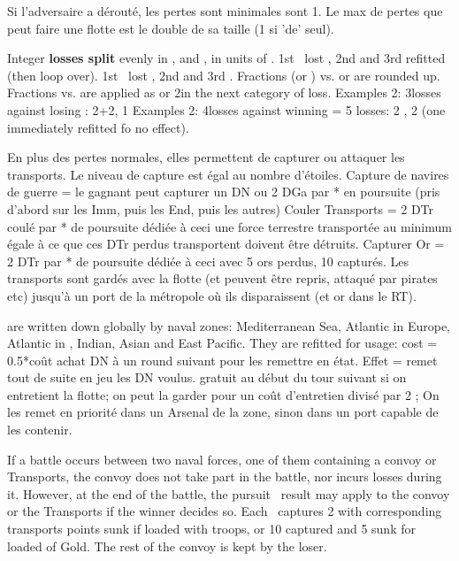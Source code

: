\bparag Si l'adversaire a dérouté, les pertes sont minimales sont 1.
\bparag Le max de pertes que peut faire une flotte est le double de sa taille
       (1 si 'de' seul).


\bparag  Integer {\bf losses split} evenly in ,  and , in units of \ND.
 1st \ND\ lost  , 2nd  and 3rd refitted (then loop over).
 1st \ND\ lost  , 2nd  and 3rd .
\bparag Fractions (\tu or \td) vs. \NGD or \NTD are  rounded up. Fractions vs. \ND are applied as \NDE or 2\NDE  in the next category of loss.
\bparag Examples 2: 3\td losses against losing \ND: 2\ND+2, 1 \bparag Examples 2: 4\tu losses against winning \NGD = 5 losses: 2  , 2  (one immediately refitted fo no effect).


 En plus des pertes normales, elles permettent
de capturer ou attaquer les transports. Le niveau de capture est égal
au nombre d'étoiles.
\bparag Capture de navires de guerre = le gagnant peut capturer un DN ou
2 DGa par * en poursuite        (pris d'abord sur les Imm, puis les End, puis les autres)
\bparag Couler Transports = 2 DTr coulé par * de poursuite dédiée à ceci
       une force terrestre transportée au minimum égale à ce que
       ces DTr perdus transportent doivent être détruits.
\bparag Capturer Or = 2 DTr par * de poursuite dédiée à ceci avec 5 ors perdus, 10 \ducats capturés.
Les transports sont gardés avec la flotte (et peuvent être repris, attaqué par pirates etc)
jusqu'à un port de la métropole où ils disparaissent (et or dans le RT).

  \ND are written down globally by naval zones:
Mediterranean Sea, Atlantic in Europe, Atlantic in \ROTW, Indian, Asian and East Pacific.
They are refitted for usage:
\bparag cost = 0.5*coût achat DN à un round suivant pour les remettre en état.
               Effet = remet tout de suite en jeu les DN voulus.
\bparag gratuit au début du tour suivant si on entretient la flotte;
\bparag on peut la garder  pour un coût d'entretien divisé par 2 ;
\bparag On les remet en priorité dans un Arsenal de la zone, sinon dans un
port capable de les contenir.

 If a battle occurs between two naval forces,
one of them containing a convoy or Transports, the convoy does not take
part in the battle, nor incurs losses during it.
\bparag However, at the end of the battle, the pursuit \textetoilex\
result may apply to the convoy or the Transports if the winner decides
so.
\bparag Each \textetoilex\ captures 2 \NTD with corresponding transports
points sunk if loaded with troops, or 10 \ducats captured and 5 \ducats
sunk for \NTD loaded of Gold.
\bparag The rest of the convoy is kept by the loser.

